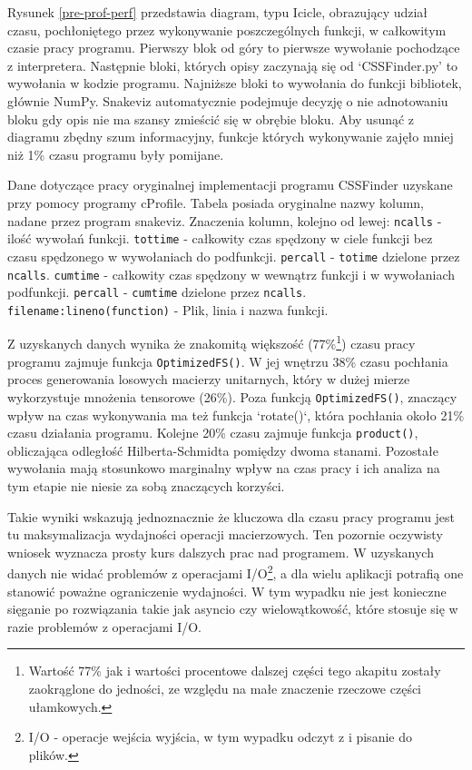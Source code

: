 \documentclass[11pt, a4paper]{article}
\newcommand{\code}[1]{\texttt{#1}}
\begin{document}
\begin{sloppypar}
    Rysunek \ref{pre-prof-perf} przedstawia diagram, typu Icicle, obrazujący udział
    czasu, pochłoniętego przez wykonywanie poszczególnych funkcji, w całkowitym czasie
    pracy programu. Pierwszy blok od góry to pierwsze wywołanie pochodzące z interpretera.
    Następnie bloki, których opisy zaczynają się od `CSSFinder.py' to wywołania w kodzie
    programu. Najniższe bloki to wywołania do funkcji bibliotek, głównie NumPy. Snakeviz
    automatycznie podejmuje decyzję o nie adnotowaniu bloku gdy opis nie ma szansy
    zmieścić się w obrębie bloku. Aby usunąć z diagramu zbędny szum informacyjny,
    funkcje których wykonywanie zajęło mniej niż 1\% czasu programu były pomijane.

    \FloatBarrier
    \begin{table}[ht]
      \tiny
      \centering
      
      \caption{Dane dotyczące pracy oryginalnej implementacji programu CSSFinder uzyskane przy pomocy programy cProfile. Tabela posiada oryginalne nazwy kolumn, nadane przez program snakeviz. Znaczenia kolumn, kolejno od lewej: \code{ncalls} - ilość wywołań funkcji. \code{tottime} - całkowity czas spędzony w ciele funkcji bez czasu spędzonego w wywołaniach do podfunkcji. \code{percall} - \code{totime} dzielone przez \code{ncalls}. \code{cumtime} - całkowity czas spędzony w wewnątrz funkcji i w wywołaniach podfunkcji. \code{percall} - \code{cumtime} dzielone przez \code{ncalls}. \code{filename:lineno(function)} - Plik, linia i nazwa funkcji.}
    \end{table}
    \FloatBarrier

    Z uzyskanych danych wynika że znakomitą większość (77\%\footnote{Wartość 77\% jak i
    wartości procentowe dalszej części tego akapitu zostały zaokrąglone do jedności, ze względu
    na małe znaczenie rzeczowe części ułamkowych.}) czasu pracy programu zajmuje funkcja
    \code{OptimizedFS()}. W jej wnętrzu 38\% czasu pochłania proces generowania losowych
    macierzy unitarnych, który w dużej mierze wykorzystuje mnożenia tensorowe (26\%).
    Poza funkcją \code{OptimizedFS()}, znaczący wpływ na czas wykonywania ma też funkcja
    `rotate()`, która pochłania około 21\% czasu działania programu. Kolejne 20\% czasu
    zajmuje funkcja \code{product()}, obliczająca odległość Hilberta-Schmidta pomiędzy
    dwoma stanami. Pozostałe wywołania mają stosunkowo marginalny wpływ na czas pracy i ich
    analiza na tym etapie nie niesie za sobą znaczących korzyści.

    Takie wyniki wskazują jednoznacznie że kluczowa dla czasu pracy programu jest tu maksymalizacja
    wydajności operacji macierzowych. Ten pozornie oczywisty wniosek wyznacza prosty
    kurs dalszych prac nad programem. W uzyskanych danych nie widać problemów z operacjami
    I/O\footnote{I/O - operacje wejścia wyjścia, w tym wypadku odczyt z i pisanie do plików.},
    a dla wielu aplikacji potrafią one stanowić poważne ograniczenie wydajności. W tym wypadku
    nie jest konieczne sięganie po rozwiązania takie jak asyncio czy wielowątkowość,
    które stosuje się w razie problemów z operacjami I/O.


\end{sloppypar}
\end{document}
